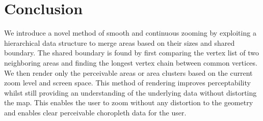 
\section{Conclusion}
We introduce a novel method of smooth and continuous zooming by exploiting a hierarchical data structure to merge areas based on their sizes and shared boundary. The shared boundary is found by first comparing the vertex list of two neighboring areas and finding the longest vertex chain between common vertices. We then render only the perceivable areas or area clusters based on the current zoom level and screen space. This method of rendering improves perceptability whilst still providing an understanding of the underlying data without distorting the map. This enables the user to zoom without any distortion to the geometry and enables clear perceivable choropleth data for the user. 

